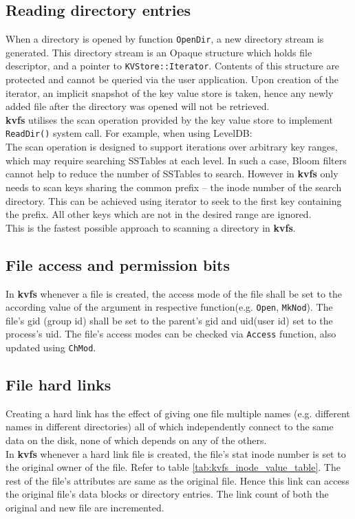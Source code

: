 \documentclass[bsc,frontabs,twoside,singlespacing,parskip,deptreport]{infthesis}     %
\begin{document}
{\subsection{Reading directory entries}
When a directory is opened by function {\tt OpenDir}, a new directory stream is generated. This directory stream is an Opaque structure which holds file descriptor, and a pointer to {\tt KVStore::Iterator}. Contents of this structure are protected and cannot be queried via the user application. Upon creation of the iterator, an implicit snapshot of the key value store is taken, hence any newly added file after the directory was opened will not be retrieved.
\\ 
{\bf kvfs} utilises the scan operation provided by the key value store to implement {\tt ReadDir()} system call.  For example, when using LevelDB: 
\\ The scan operation is designed to support iterations over arbitrary key ranges, which may require searching SSTables at each level. In such a case, Bloom filters cannot help to reduce the number of SSTables to search. However in {\bf kvfs} only  needs to scan keys sharing the common prefix -- the inode number of the search directory. This can be achieved using iterator to seek to the first key containing the prefix. All other keys which are not in the desired range are ignored.
\\ This is the fastest possible approach to scanning a directory in {\bf kvfs}.
\subsection{File access and permission bits}
In {\bf kvfs} whenever a file is created, the access mode of the file shall be set to the according value of the argument in respective function(e.g. {\tt Open}, {\tt MkNod}). The file's gid (group id) shall be set to the parent's gid and uid(user id) set to the process's uid. The file's access modes can be checked via {\tt Access} function, also updated using {\tt ChMod}.
\subsection{File hard links}
Creating a hard link has the effect of giving one file multiple names (e.g. different names in different directories) all of which independently connect to the same data on the disk, none of which depends on any of the others. \cite{wiki:Hard_link}
\\ In {\bf kvfs} whenever a hard link file is created, the file's stat inode number is set to the original owner of the file. Refer to table \ref{tab:kvfs_inode_value_table}. The rest of the file's attributes are same as the original file. Hence this link can access the original file's data blocks or directory entries. The link count of both the original and new file are incremented.
}
\end{document}
